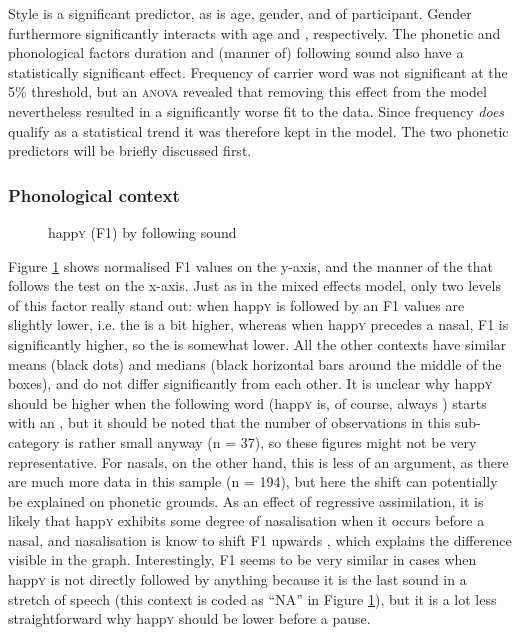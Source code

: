 Style is a significant predictor, as is age, gender, and  of participant.
Gender furthermore significantly interacts with age and , respectively.
The phonetic and phonological factors duration and (manner of) following sound also have a statistically significant effect.
Frequency of carrier word was not significant at the 5\% threshold, but an \textsc{anova} revealed that removing this effect from the model nevertheless resulted in a significantly worse fit to the data.
Since frequency \emph{does} qualify as a statistical trend it was therefore kept in the model.
The two phonetic predictors will be briefly discussed first.

			\subsubsection{Phonological context}
			\label{sec.prod.res.vow.happy.f1.phon}

	\begin{figure}[h!]
		\centering
		\resizebox{0.5\linewidth}{!}{} 
		\caption{happ\textsc{y} (F1) by following sound}
		\label{fig.box.f1w.happy.follsound}
	\end{figure}

Figure \ref{fig.box.f1w.happy.follsound} shows normalised F1 values on the y-axis, and the manner of the  that follows the test  on the x-axis.
Just as in the mixed effects model, only two levels of this factor really stand out: when happ\textsc{y} is followed by an  F1 values are slightly lower, i.e. the  is a bit higher, whereas when happ\textsc{y} precedes a nasal, F1 is significantly higher, so the  is somewhat lower.
All the other contexts have similar means (black dots) and medians (black horizontal bars around the middle of the boxes), and do not differ significantly from each other.
It is unclear why happ\textsc{y} should be higher when the following word (happ\textsc{y} is, of course, always ) starts with an , but it should be noted that the number of observations in this sub-category is rather small anyway (n = 37), so these figures might not be very representative.
For nasals, on the other hand, this is less of an argument, as there are much more data in this sample (n = 194), but here the shift can potentially be explained on phonetic grounds.
As an effect of regressive assimilation, it is likely that happ\textsc{y} exhibits some degree of nasalisation when it occurs before a nasal, and nasalisation is know to shift F1 upwards \parencite{housestevens1956}, which explains the difference visible in the graph.
Interestingly, F1 seems to be very similar in cases when happ\textsc{y} is not directly followed by anything because it is the last sound in a stretch of speech (this context is coded as ``NA'' in Figure \ref{fig.box.f1w.happy.follsound}), but it is a lot less straightforward why happ\textsc{y} should be lower before a pause.

